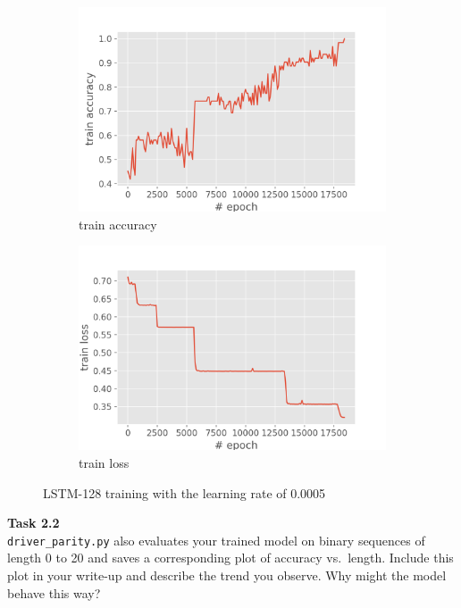 \documentclass[12pt,article]{article}
\newenvironment{task}[2][Task]
    { \begin{mdframed}[backgroundcolor=gray!20] \textbf{#1 #2} \\}
    {  \end{mdframed}}
\begin{document}
\begin{figure}[H]
\centering
\begin{subfigure}{.5\textwidth}
    \centering
    \includegraphics[scale=0.6]{LSTM-128_parity_train_accuracy.png} \par
    \caption{train accuracy}
\end{subfigure}%
\begin{subfigure}{.5\textwidth}
    \centering
    \includegraphics[scale=0.6]{LSTM-128_parity_train_loss.png} \par
    \caption{train loss}
\end{subfigure}
\caption{LSTM-128 training with the learning rate of 0.0005}
\label{fig:lstm128-training}
\end{figure}

\newpage
\begin{task}{2.2} 
\texttt{driver\_parity.py} also evaluates your trained model on binary sequences of length 0 to 20 and saves a corresponding plot of accuracy vs.~length. Include this plot in your write-up and describe the trend you observe. Why might the model behave this way?
\end{task}
\end{document}
